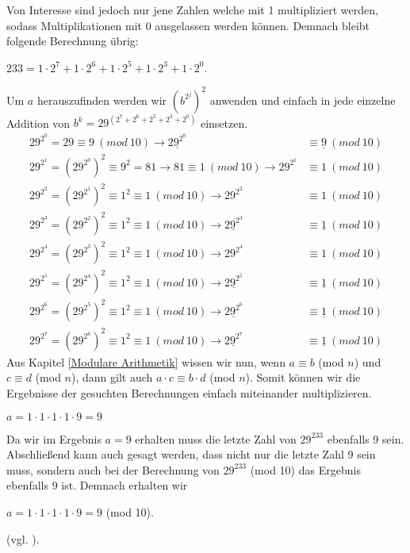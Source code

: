 \documentclass[12pt,a4paper]{article}
\theoremstyle{definition}
\begin{document}
Von Interesse sind jedoch nur jene Zahlen welche mit 1 multipliziert werden, sodass Multiplikationen mit 0 ausgelassen werden können.
Demnach bleibt folgende Berechnung übrig:
\begin{center}
$233 = 1 \cdot 2^7 + 1 \cdot 2^6 + 1 \cdot2^5 + 1 \cdot 2^3 + 1 \cdot 2^0$.
\end{center}

Um $a$ herauszufinden werden wir $(b^{2^j})^2$ anwenden und einfach in jede einzelne Addition von $b^k = 29^{(2^7 + 2^6 + 2^5 + 2^3 + 2^0)}$ einsetzen.
\begin{align}
29^{2^0} = 29 \equiv 9\ (mod\ 10)                           \rightarrow \underline{29^{2^0}} &\equiv \underline{9}\ (mod\ 10) \\
29^{2^1} = (29^{2^0})^2 \equiv 9^2 = 81 \rightarrow 81 \equiv 1\ (mod\ 10) \rightarrow 29^{2^1} &\equiv 1\ (mod\ 10) \\
29^{2^2} = (29^{2^1})^2 \equiv 1^2 \equiv 1\ (mod\ 10) \rightarrow 29^{2^2} &\equiv 1\ (mod\ 10) \\
29^{2^3} = (29^{2^2})^2 \equiv 1^2 \equiv 1\ (mod\ 10) \rightarrow \underline{29^{2^3}} &\equiv \underline{1}\ (mod\ 10) \\
29^{2^4} = (29^{2^3})^2 \equiv 1^2 \equiv 1\ (mod\ 10) \rightarrow 29^{2^4} &\equiv 1\ (mod\ 10) \\
29^{2^5} = (29^{2^4})^2 \equiv 1^2 \equiv 1\ (mod\ 10) \rightarrow \underline{29^{2^5}} &\equiv \underline{1}\ (mod\ 10) \\
29^{2^6} = (29^{2^5})^2 \equiv 1^2 \equiv 1\ (mod\ 10) \rightarrow \underline{29^{2^6}} &\equiv \underline{1}\ (mod\ 10) \\
29^{2^7} = (29^{2^6})^2 \equiv 1^2 \equiv 1\ (mod\ 10) \rightarrow \underline{29^{2^7}} &\equiv \underline{1}\ (mod\ 10)
\end{align}
Aus Kapitel \ref{Modulare Arithmetik} wissen wir nun, wenn $a\equiv b$ (mod $n$) und $c\equiv d$ (mod $n$), dann gilt auch $a \cdot c\equiv b \cdot d$ (mod $n$).
Somit können wir die Ergebnisse der gesuchten Berechnungen einfach miteinander multiplizieren.
\begin{center}
$a = 1 \cdot 1 \cdot 1 \cdot 1 \cdot 9 = 9$
\end{center}
Da wir im Ergebnis $a = 9$ erhalten muss die letzte Zahl von $29^{233}$ ebenfalls 9 sein.
Abschließend kann auch gesagt werden, dass nicht nur die letzte Zahl 9 sein muss, sondern auch bei der Berechnung von $29^{233}$ (mod 10) das Ergebnis ebenfalls 9 ist.
Demnach erhalten wir
\begin{center}
$a = 1 \cdot 1 \cdot 1 \cdot 1 \cdot 9 = 9$ (mod 10).
\end{center}
(vgl. \cite[122]{Arndt2000}).
\end{document}
